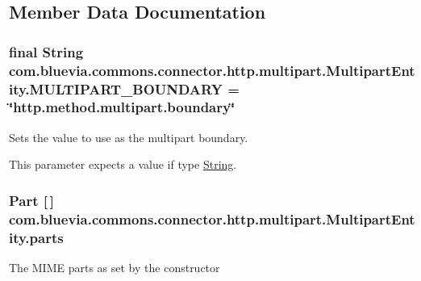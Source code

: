 \subsection{Member Data Documentation}
\hypertarget{classcom_1_1bluevia_1_1commons_1_1connector_1_1http_1_1multipart_1_1MultipartEntity_a333f6a62bf491dff95937cd562a25cd4}{
\subsubsection[{MULTIPART\_\-BOUNDARY}]{\setlength{\rightskip}{0pt plus 5cm}final String {\bf com.bluevia.commons.connector.http.multipart.MultipartEntity.MULTIPART\_\-BOUNDARY} = \char`\"{}http.method.multipart.boundary\char`\"{}}}
\label{classcom_1_1bluevia_1_1commons_1_1connector_1_1http_1_1multipart_1_1MultipartEntity_a333f6a62bf491dff95937cd562a25cd4}
Sets the value to use as the multipart boundary. 

This parameter expects a value if type \hyperlink{}{String}.  \hypertarget{classcom_1_1bluevia_1_1commons_1_1connector_1_1http_1_1multipart_1_1MultipartEntity_a57c7f88c9eb78f75b17addf1aa7fa891}{
\subsubsection[{parts}]{\setlength{\rightskip}{0pt plus 5cm}Part \mbox{[}$\,$\mbox{]} {\bf com.bluevia.commons.connector.http.multipart.MultipartEntity.parts}}}
\label{classcom_1_1bluevia_1_1commons_1_1connector_1_1http_1_1multipart_1_1MultipartEntity_a57c7f88c9eb78f75b17addf1aa7fa891}
The MIME parts as set by the constructor 